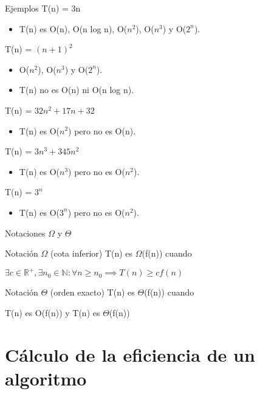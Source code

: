 \begin{frame}[c]{Ejemplos}
  T(n) = 3n
  \begin{itemize}
    \item T(n) es O(n), O(n log n), O($n^2$), O($n^3$) y O($2^n$).
  \end{itemize}

  \pausa
  T(n) = $(n+1)^2$
  \begin{itemize}
    \item O($n^2$), O($n^3$) y O($2^n$).
    \item T(n) no es O(n) ni O(n log n).
  \end{itemize}

  \pausa
  T(n) = $32n^2 + 17n + 32$
  \begin{itemize}
    \item T(n) es O($n^2$) pero no es O(n).
  \end{itemize}

  \pausa
  T(n) = $3n^3 + 345n^2$
  \begin{itemize}
    \item T(n) es O($n^3$) pero no es O($n^2$).
  \end{itemize}

  \pausa
  T(n) = $3^n$
  \begin{itemize}
    \item T(n) es O($3^n$) pero no es O($n^2$).
  \end{itemize}
\end{frame}

\begin{frame}[c]{Notaciones $\Omega$ y $\Theta$}
  \begin{block}{Notación $\Omega$ (cota inferior)}
    T(n) es $\Omega$(f(n)) cuando

    \begin{math}
      \exists c \in \mathbb{R}^+, \exists n_0 \in \mathbb{N}:
      \forall n \geq n_0 \implies T(n) \geq cf(n)
    \end{math}
  \end{block}

  \pausa
  \begin{block}{Notación $\Theta$ (orden exacto)}
    T(n) es $\Theta$(f(n)) cuando

    T(n) es O(f(n)) y T(n) es $\Theta$(f(n))
  \end{block}
\end{frame}

\section{Cálculo de la eficiencia de un algoritmo}

